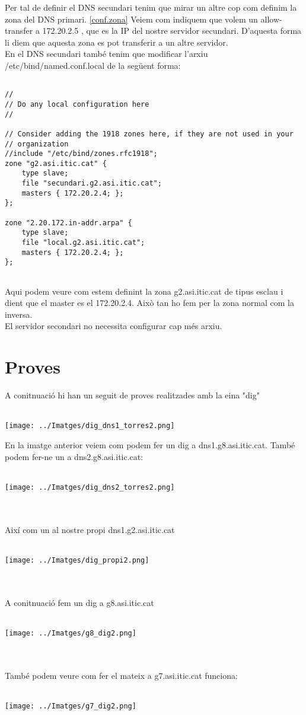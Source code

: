 \documentclass[11p]{article}
\begin{document}
Per tal de definir el DNS secundari tenim que mirar un altre cop com definim la zona del DNS primari. \ref{conf.zona}
Veiem com indiquem que volem un allow-transfer	a 172.20.2.5 , que es la IP del nostre servidor secundari. D'aquesta forma li diem que aquesta zona es pot transferir a un altre servidor.\\
En el DNS secundari també tenim que modificar l'arxiu /etc/bind/named.conf.local de la següent forma:
\begin{lstlisting}

//
// Do any local configuration here
//

// Consider adding the 1918 zones here, if they are not used in your
// organization
//include "/etc/bind/zones.rfc1918";
zone "g2.asi.itic.cat" {
	type slave;
	file "secundari.g2.asi.itic.cat";
	masters { 172.20.2.4; };
};

zone "2.20.172.in-addr.arpa" {
	type slave;
	file "local.g2.asi.itic.cat";
	masters { 172.20.2.4; };
};


\end{lstlisting}

Aqui podem veure com estem definint la zona g2.asi.itic.cat de tipus esclau i dient que el master es el 172.20.2.4. Això tan ho fem per la zona normal com la inversa.\\

El servidor secondari no necessita configurar cap més arxiu.
\newpage 
\section{Proves}

A conitnuació hi han un seguit de proves realitzades amb la eina "dig"\\\\
\centerline{\texttt{[image: ../Imatges/dig\_dns1\_torres2.png]}}
En la imatge anterior veiem com podem fer un dig a dns1.g8.asi.itic.cat. També podem fer-ne un a dns2.g8.asi.itic.cat:\\\\
\centerline{\texttt{[image: ../Imatges/dig\_dns2\_torres2.png]} }\\\\
Així com un al nostre propi dns1.g2.asi.itic.cat\\\\
\centerline{\texttt{[image: ../Imatges/dig\_propi2.png]} }\\\\
A conitnuació fem un dig a g8.asi.itic.cat\\\\
\centerline{\texttt{[image: ../Imatges/g8\_dig2.png]} }\\\\
També podem veure com fer el mateix a g7.asi.itic.cat funciona:\\\\
\centerline{\texttt{[image: ../Imatges/g7\_dig2.png]} }\\\\
\end{document}
